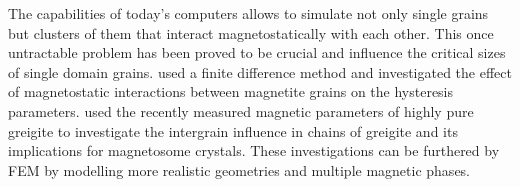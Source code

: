 The capabilities of today's computers allows to simulate not only single grains but clusters of them that interact magnetostatically with each other. This once untractable problem has been proved to be crucial and influence the critical sizes of single domain grains. \citet{Mxwt2} used a finite difference method and investigated the effect of magnetostatic interactions between magnetite grains on the hysteresis parameters. \citet{Mxwt1} used the recently measured \citep{Chang} magnetic parameters of highly pure greigite to investigate the intergrain influence in chains of greigite and its implications for magnetosome crystals. These investigations can be furthered by FEM by modelling more realistic geometries and multiple magnetic phases.
